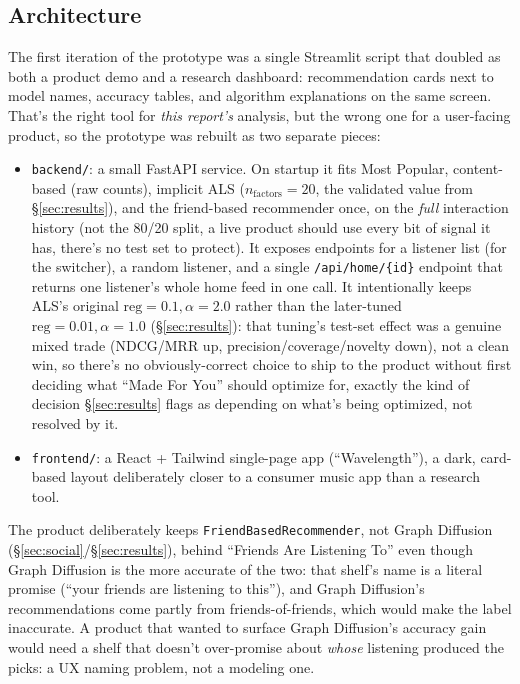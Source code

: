 \documentclass[11pt,a4paper]{article}
\newcommand{\code}[1]{\texttt{#1}}
\newcommand{\secref}[1]{\S\ref{#1}}
\begin{document}
\subsection{Architecture}

The first iteration of the prototype was a single Streamlit script that doubled as both a product demo and a research dashboard: recommendation cards next to model names, accuracy tables, and algorithm explanations on the same screen. That's the right tool for \emph{this report's} analysis, but the wrong one for a user-facing product, so the prototype was rebuilt as two separate pieces:

\begin{itemize}[leftmargin=*]
  \item \code{backend/}: a small FastAPI service. On startup it fits Most Popular, content-based (raw counts), implicit ALS ($n_{\text{factors}}=20$, the validated value from \secref{sec:results}), and the friend-based recommender once, on the \emph{full} interaction history (not the 80/20 split, a live product should use every bit of signal it has, there's no test set to protect). It exposes endpoints for a listener list (for the switcher), a random listener, and a single \code{/api/home/\{id\}} endpoint that returns one listener's whole home feed in one call. It intentionally keeps ALS's original $\text{reg}=0.1, \alpha=2.0$ rather than the later-tuned $\text{reg}=0.01, \alpha=1.0$ (\secref{sec:results}): that tuning's test-set effect was a genuine mixed trade (NDCG/MRR up, precision/coverage/novelty down), not a clean win, so there's no obviously-correct choice to ship to the product without first deciding what ``Made For You'' should optimize for, exactly the kind of decision \secref{sec:results} flags as depending on what's being optimized, not resolved by it.
  \item \code{frontend/}: a React + Tailwind single-page app (``Wavelength''), a dark, card-based layout deliberately closer to a consumer music app than a research tool.
\end{itemize}

The product deliberately keeps \code{FriendBasedRecommender}, not Graph Diffusion (\secref{sec:social}/\secref{sec:results}), behind ``Friends Are Listening To'' even though Graph Diffusion is the more accurate of the two: that shelf's name is a literal promise (``your friends are listening to this''), and Graph Diffusion's recommendations come partly from friends-of-friends, which would make the label inaccurate. A product that wanted to surface Graph Diffusion's accuracy gain would need a shelf that doesn't over-promise about \emph{whose} listening produced the picks: a UX naming problem, not a modeling one.
\end{document}

